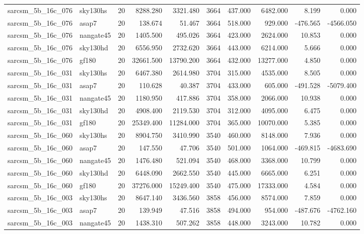 \documentclass{article}
\begin{document}
\begin{longtable}{llrrrrrrrr}
sarcsm\_5b\_16c\_076 & sky130hs & 20 & 8288.280 & 3321.480 & 3664 & 437.000 & 6482.000 & 8.199 & 0.000 \\
sarcsm\_5b\_16c\_076 & asap7 & 20 & 138.674 & 51.467 & 3664 & 518.000 & 929.000 & -476.565 & -4566.050 \\
sarcsm\_5b\_16c\_076 & nangate45 & 20 & 1405.500 & 495.026 & 3664 & 423.000 & 2624.000 & 10.853 & 0.000 \\
sarcsm\_5b\_16c\_076 & sky130hd & 20 & 6556.950 & 2732.620 & 3664 & 443.000 & 6214.000 & 5.666 & 0.000 \\
sarcsm\_5b\_16c\_076 & gf180 & 20 & 32661.500 & 13790.200 & 3664 & 432.000 & 13277.000 & 4.850 & 0.000 \\
sarcsm\_5b\_16c\_031 & sky130hs & 20 & 6467.380 & 2614.980 & 3704 & 315.000 & 4535.000 & 8.505 & 0.000 \\
sarcsm\_5b\_16c\_031 & asap7 & 20 & 110.628 & 40.387 & 3704 & 433.000 & 605.000 & -491.528 & -5079.400 \\
sarcsm\_5b\_16c\_031 & nangate45 & 20 & 1180.950 & 417.886 & 3704 & 358.000 & 2066.000 & 10.938 & 0.000 \\
sarcsm\_5b\_16c\_031 & sky130hd & 20 & 4908.400 & 2119.530 & 3704 & 312.000 & 4095.000 & 6.475 & 0.000 \\
sarcsm\_5b\_16c\_031 & gf180 & 20 & 25349.400 & 11284.000 & 3704 & 365.000 & 10070.000 & 5.385 & 0.000 \\
sarcsm\_5b\_16c\_060 & sky130hs & 20 & 8904.750 & 3410.990 & 3540 & 460.000 & 8148.000 & 7.936 & 0.000 \\
sarcsm\_5b\_16c\_060 & asap7 & 20 & 147.550 & 47.706 & 3540 & 501.000 & 1064.000 & -469.815 & -4683.690 \\
sarcsm\_5b\_16c\_060 & nangate45 & 20 & 1476.480 & 521.094 & 3540 & 468.000 & 3368.000 & 10.799 & 0.000 \\
sarcsm\_5b\_16c\_060 & sky130hd & 20 & 6448.090 & 2662.550 & 3540 & 445.000 & 6665.000 & 6.251 & 0.000 \\
sarcsm\_5b\_16c\_060 & gf180 & 20 & 37276.000 & 15249.400 & 3540 & 475.000 & 17333.000 & 4.584 & 0.000 \\
sarcsm\_5b\_16c\_003 & sky130hs & 20 & 8647.140 & 3436.560 & 3858 & 456.000 & 8574.000 & 7.859 & 0.000 \\
sarcsm\_5b\_16c\_003 & asap7 & 20 & 139.949 & 47.516 & 3858 & 494.000 & 954.000 & -487.676 & -4762.160 \\
sarcsm\_5b\_16c\_003 & nangate45 & 20 & 1438.310 & 507.262 & 3858 & 448.000 & 3243.000 & 10.782 & 0.000 \\

\end{longtable}
\end{document}
